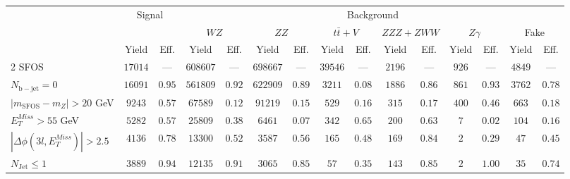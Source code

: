 \begin{tabular}{l||c|c||c|c||c|c||c|c||c|c||c|c||c|c}
\hline
 &\multicolumn{2}{c||}{Signal}            &  \multicolumn{12}{c}{Background}  \\
 & &  & \multicolumn{2}{c||}{$WZ$} & \multicolumn{2}{c||}{$ZZ$} & \multicolumn{2}{c||}{$t\bar{t}+V$} & \multicolumn{2}{c||}{$ZZZ+ZWW$} & \multicolumn{2}{c||}{$Z\gamma$} & \multicolumn{2}{c}{Fake}  \\ 
 & Yield & Eff. & Yield & Eff. & Yield & Eff. & Yield & Eff. & Yield & Eff. & Yield & Eff. & Yield & Eff. \\
\hline\hline
2 SFOS &  $17014$ &  --- &  $608607$ &  --- &  $698667$ &  --- &  $39546$ &  --- &  $2196$ &  --- &  $926$ &  --- &  $4849$ &  ---\\ 
\hline
$N_{\mathrm{b-jet}}=0$ &  $16091$ &  $0.95$ &  $561809$ &  $0.92$ &  $622909$ &  $0.89$ &  $3211$ &  $0.08$ &  $1886$ &  $0.86$ &  $861$ &  $0.93$ &  $3762$ &  $0.78$\\ 
\hline
$| m_{\mathrm{SFOS}} - m_Z | >  20$ GeV &  $9243$ &  $0.57$ &  $67589$ &  $0.12$ &  $91219$ &  $0.15$ &  $529$ &  $0.16$ &  $315$ &  $0.17$ &  $400$ &  $0.46$ &  $663$ &  $0.18$\\ 
\hline
$E_{T}^{Miss} > 55$ GeV &  $5282$ &  $0.57$ &  $25809$ &  $0.38$ &  $6461$ &  $0.07$ &  $342$ &  $0.65$ &  $200$ &  $0.63$ &  $7$ &  $0.02$ &  $104$ &  $0.16$\\ 
\hline
$|\Delta\phi(3l,E_{T}^{Miss})| > 2.5$ &  $4136$ &  $0.78$ &  $13300$ &  $0.52$ &  $3587$ &  $0.56$ &  $165$ &  $0.48$ &  $169$ &  $0.84$ &  $2$ &  $0.29$ &  $47$ &  $0.45$\\ 
\hline
$N_{\mathrm{Jet}} \leq 1$ &  $3889$ &  $0.94$ &  $12135$ &  $0.91$ &  $3065$ &  $0.85$ &  $57$ &  $0.35$ &  $143$ &  $0.85$ &  $2$ &  $1.00$ &  $35$ &  $0.74$\\ 
\hline
\end{tabular}
